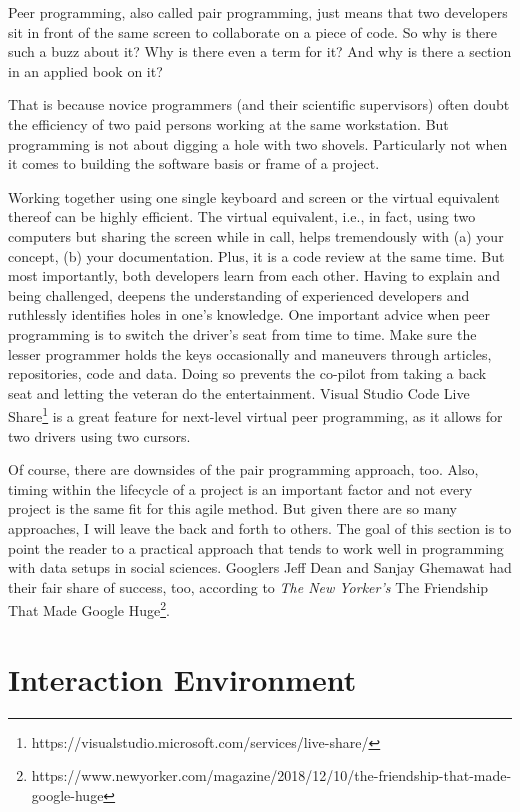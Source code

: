 \documentclass[
  12pt,
  letterpaper,
]{krantz}
\begin{document}
Peer programming, also called pair programming, just means that two
developers sit in front of the same screen to collaborate on a piece of
code. So why is there such a buzz about it? Why is there even a term for
it? And why is there a section in an applied book on it?

That is because novice programmers (and their scientific supervisors)
often doubt the efficiency of two paid persons working at the same
workstation. But programming is not about digging a hole with two
shovels. Particularly not when it comes to building the software basis
or frame of a project.

Working together using one single keyboard and screen or the virtual
equivalent thereof can be highly efficient. The virtual equivalent,
i.e., in fact, using two computers but sharing the screen while in call,
helps tremendously with (a) your concept, (b) your documentation. Plus,
it is a code review at the same time. But most importantly, both
developers learn from each other. Having to explain and being
challenged, deepens the understanding of experienced developers and
ruthlessly identifies holes in one's knowledge. One important advice
when peer programming is to switch the driver's seat from time to time.
Make sure the lesser programmer holds the keys occasionally and
maneuvers through articles, repositories, code and data. Doing so
prevents the co-pilot from taking a back seat and letting the veteran do
the entertainment. Visual Studio Code Live Share\footnote{https://visualstudio.microsoft.com/services/live-share/}
is a great feature for next-level virtual peer programming, as it allows
for two drivers using two cursors.

Of course, there are downsides of the pair programming approach, too.
Also, timing within the lifecycle of a project is an important factor
and not every project is the same fit for this agile method. But given
there are so many approaches, I will leave the back and forth to others.
The goal of this section is to point the reader to a practical approach
that tends to work well in programming with data setups in social
sciences. Googlers Jeff Dean and Sanjay Ghemawat had their fair share of
success, too, according to \emph{The New Yorker's} The Friendship That
Made Google Huge\footnote{https://www.newyorker.com/magazine/2018/12/10/the-friendship-that-made-google-huge}.


\hypertarget{interaction-environment-1}{%
\chapter{Interaction Environment}\label{interaction-environment-1}}
\end{document}
